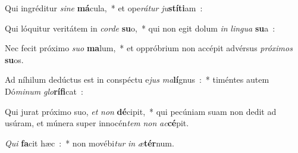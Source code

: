 ﻿\item Qui ingréditur \emph{si}\emph{ne} \textbf{má}cula,~* et ope\emph{rá}\emph{tur} \emph{ju}\textbf{stí}\textbf{ti}am~:
\item Qui lóquitur veritátem in \emph{cor}\emph{de} \textbf{su}o,~* qui non egit dolum \emph{in} \emph{lin}\emph{gua} \textbf{su}a~:
\item Nec fecit próximo \emph{su}\emph{o} \textbf{ma}lum,~* et oppróbrium non accépit advérsus \emph{pró}\emph{xi}\emph{mos} \textbf{su}os.
\item Ad níhilum dedúctus est in conspéctu e\emph{jus} \emph{ma}\textbf{lí}gnus~:~* timéntes autem Dó\emph{mi}\emph{num} \emph{glo}\textbf{rí}\textbf{fi}cat~:
\item Qui jurat próximo suo, \emph{et} \emph{non} \textbf{dé}cipit,~* qui pecúniam suam non dedit ad usúram, et múnera super innocén\emph{tem} \emph{non} \emph{ac}\textbf{cé}pit.
\item \emph{Qui} \textbf{fa}cit hæc~:~* non movébi\emph{tur} \emph{in} \emph{æ}\textbf{tér}num.